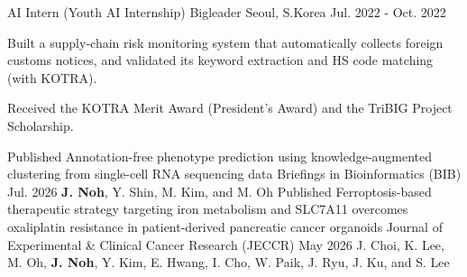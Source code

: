 \documentclass[11pt, a4paper]{awesome-cv}
\let\origcvsection\cvsection
\renewcommand{\cvsection}[1]{\needspace{7\baselineskip}\origcvsection{#1}}
\let\origcvsubsection\cvsubsection
\renewcommand{\cvsubsection}[1]{\needspace{5\baselineskip}\origcvsubsection{#1}}
\begin{document}
\begin{cventries}
{\begin{cvitems}
      \end{cvitems}
    }
\vspace{-1mm}
\cventry
    {AI Intern (Youth AI Internship)}
    {Bigleader}
    {Seoul, S.Korea}
    {Jul. 2022 - Oct. 2022}
    {
      \begin{cvitems}
        \item {Built a supply-chain risk monitoring system that automatically collects foreign customs notices, and validated its keyword extraction and HS code matching (with KOTRA).}
        \item {Received the KOTRA Merit Award (President's Award) and the TriBIG Project Scholarship.}
      \end{cvitems}
    }
\end{cventries}


\vspace{-3.5mm}



\begin{cventries}
\cventry
    {Published}
    {Annotation-free phenotype prediction using knowledge-augmented clustering \newline from single-cell RNA sequencing data}
    {Briefings in Bioinformatics (BIB)}
    {Jul. 2026}
    {
      \textbf{J. Noh}, Y. Shin, M. Kim, and M. Oh
    }
\vspace{3.5mm}
\cventry
    {Published}
    {Ferroptosis-based therapeutic strategy targeting iron metabolism and SLC7A11 overcomes oxaliplatin resistance in patient-derived pancreatic cancer organoids}
    {Journal of Experimental \& Clinical Cancer Research (JECCR)}
    {May 2026}
    {
      J. Choi, K. Lee, M. Oh, \textbf{J. Noh}, Y. Kim, E. Hwang,
      I. Cho, W. Paik, J. Ryu, J. Ku, and S. Lee
    }
\end{cventries}

\end{document}
